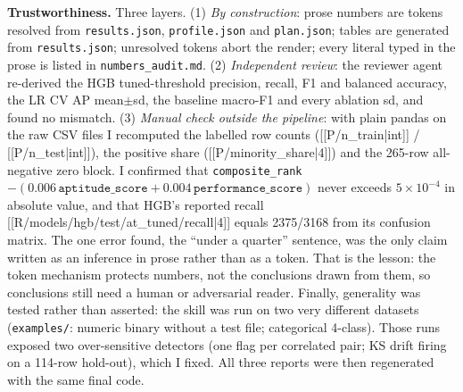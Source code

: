 \textbf{Trustworthiness.} Three layers. (1) \emph{By construction}: prose numbers are tokens resolved from \texttt{results.json}, \texttt{profile.json} and \texttt{plan.json}; tables are generated from \texttt{results.json}; unresolved tokens abort the render; every literal typed in the prose is listed in \texttt{numbers\_audit.md}. (2) \emph{Independent review}: the reviewer agent re-derived the HGB tuned-threshold precision, recall, F1 and balanced accuracy, the LR CV AP mean$\pm$sd, the baseline macro-F1 and every ablation sd, and found no mismatch. (3) \emph{Manual check outside the pipeline}: with plain pandas on the raw CSV files I recomputed the labelled row counts ([[P/n_train|int]] / [[P/n_test|int]]), the positive share ([[P/minority_share|4]]) and the 265-row all-negative zero block. I confirmed that \texttt{composite\_rank} $- (0.006\,\texttt{aptitude\_score} + 0.004\,\texttt{performance\_score})$ never exceeds $5\times10^{-4}$ in absolute value, and that HGB's reported recall [[R/models/hgb/test/at_tuned/recall|4]] equals 2375/3168 from its confusion matrix. The one error found, the ``under a quarter'' sentence, was the only claim written as an inference in prose rather than as a token. That is the lesson: the token mechanism protects numbers, not the conclusions drawn from them, so conclusions still need a human or adversarial reader. Finally, generality was tested rather than asserted: the skill was run on two very different datasets (\texttt{examples/}: numeric binary without a test file; categorical 4-class). Those runs exposed two over-sensitive detectors (one flag per correlated pair; KS drift firing on a 114-row hold-out), which I fixed. All three reports were then regenerated with the same final code.

